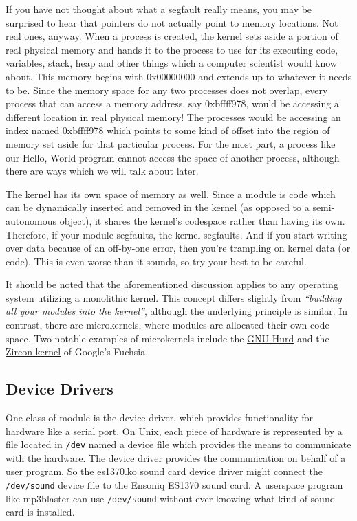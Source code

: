 \documentclass[10pt, oneside]{book}
\begin{document}
If you have not thought about what a segfault really means, you may be surprised to hear that pointers do not actually point to memory locations.
Not real ones, anyway.
When a process is created, the kernel sets aside a portion of real physical memory and hands it to the process to use for its executing code, variables, stack, heap and other things which a computer scientist would know about.
This memory begins with 0x00000000 and extends up to whatever it needs to be.
Since the memory space for any two processes does not overlap, every process that can access a memory address, say 0xbffff978, would be accessing a different location in real physical memory!
The processes would be accessing an index named 0xbffff978 which points to some kind of offset into the region of memory set aside for that particular process.
For the most part, a process like our Hello, World program cannot access the space of another process, although there are ways which we will talk about later.

The kernel has its own space of memory as well. Since a module is code which can be dynamically inserted and removed in the kernel (as opposed to a semi-autonomous object), it shares the kernel's codespace rather than having its own.
Therefore, if your module segfaults, the kernel segfaults.
And if you start writing over data because of an off-by-one error, then you're trampling on kernel data (or code).
This is even worse than it sounds, so try your best to be careful.

It should be noted that the aforementioned discussion applies to any operating system utilizing a monolithic kernel.
This concept differs slightly from \emph{``building all your modules into the kernel''},
although the underlying principle is similar.
In contrast, there are microkernels, where modules are allocated their own code space.
Two notable examples of microkernels include the \href{https://www.gnu.org/software/hurd/}{GNU Hurd} and the \href{https://fuchsia.dev/fuchsia-src/concepts/kernel}{Zircon kernel} of Google's Fuchsia.

\subsection{Device Drivers}
\label{sec:device_drivers}
One class of module is the device driver, which provides functionality for hardware like a serial port.
On Unix, each piece of hardware is represented by a file located in \verb|/dev| named a device file which provides the means to communicate with the hardware.
The device driver provides the communication on behalf of a user program.
So the es1370.ko sound card device driver might connect the \verb|/dev/sound| device file to the Ensoniq ES1370 sound card.
A userspace program like mp3blaster can use \verb|/dev/sound| without ever knowing what kind of sound card is installed.
\end{document}
